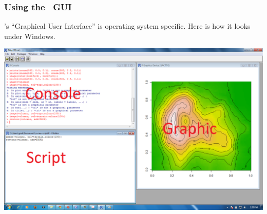 \documentclass[color=usenames,dvipsnames]{beamer}\usepackage[]{graphicx}\usepackage[]{color}
\begin{document}
\begin{frame}
  \frametitle{Using the \R~GUI}
  \R's ``Graphical User Interface'' is operating system specific. Here
  is how it looks under Windows.
  \begin{center}
    \includegraphics[width=\textwidth]{figs/R-GUI-win}
  \end{center}
\end{frame}
\end{document}

